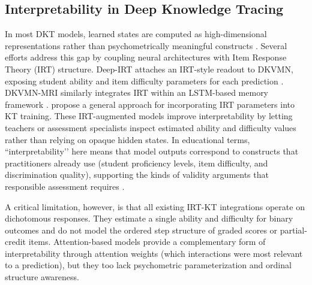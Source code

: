 \documentclass[pdflatex,sn-apa]{sn-jnl}
\begin{document}
\subsection{Interpretability in Deep Knowledge Tracing}
In most DKT models, learned states are computed as high-dimensional representations rather than psychometrically meaningful constructs \citep{nrc_knowing_2001}. Several efforts address this gap by coupling neural architectures with Item Response Theory (IRT) structure. Deep-IRT attaches an IRT-style readout to DKVMN, exposing student ability and item difficulty parameters for each prediction \citep{yeung_deep-irt_2019}. DKVMN-MRI similarly integrates IRT within an LSTM-based memory framework \citep{xu_dkvmn_2024}. \citet{converse_irt_kt_2021} propose a general approach for incorporating IRT parameters into KT training. These IRT-augmented models improve interpretability by letting teachers or assessment specialists inspect estimated ability and difficulty values rather than relying on opaque hidden states. In educational terms, ``interpretability’’ here means that model outputs correspond to constructs that practitioners already use (student proficiency levels, item difficulty, and discrimination quality), supporting the kinds of validity arguments that responsible assessment requires \citep{messick_validity_1995, kane_argument_2013}.

A critical limitation, however, is that all existing IRT-KT integrations operate on dichotomous responses. They estimate a single ability and difficulty for binary outcomes and do not model the ordered step structure of graded scores or partial-credit items. Attention-based models provide a complementary form of interpretability through attention weights (which interactions were most relevant to a prediction), but they too lack psychometric parameterization and ordinal structure awareness.
\end{document}
